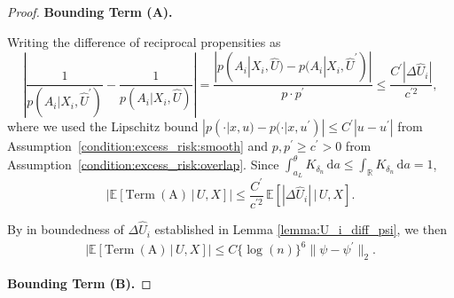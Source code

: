 \documentclass[12pt]{article}
\newcommand{\E}{\mathbb{E}}
\newcommand{\R}{\mathbb{R}}
\begin{document}
\begin{proof}
\noindent\textbf{Bounding Term (A).}

Writing the difference of reciprocal propensities as
$$\left|\frac{1}{p(A_i|X_i,\widehat U^\prime)}-\frac{1}{p(A_i|X_i,\widehat U)}\right| = \frac{|p(A_i|X_i,\widehat U)-p(A_i|X_i,\widehat U^\prime)|}{p\cdot p^\prime}\leq \frac{C^\prime|\Delta\widehat U_i|}{c^{\prime 2}},$$
where we used the Lipschitz bound $|p(\cdot|x,u)-p(\cdot|x,u^\prime)|\leq C^\prime|u-u^\prime|$ from Assumption~\ref{condition:excess_risk:smooth} and $p,p^\prime\geq c^\prime>0$ from Assumption~\ref{condition:excess_risk:overlap}.  Since $\int_{a_L}^{\theta}K_{\delta_n}\,\mathrm{d}a\leq \int_\R K_{\delta_n}\,\mathrm{d}a = 1$,
$$\left|\E\!\left[\mathrm{Term\ (A)}\,\big|\,U,X\right]\right| \leq \frac{C^\prime}{c^{\prime 2}}\,\E\!\left[|\Delta\widehat U_i|\,\big|\,U,X\right].$$

By in boundedness of $\Delta\widehat{U}_i$ established in Lemma \ref{lemma:U_i_diff_psi}, we then
\begin{align}
\left|\E\!\left[\mathrm{Term\ (A)}\,\big|\,U,X\right]\right|\leq C\{\log(n)\}^6\|\psi - \psi^\prime\|_2.
\label{eq:termA_psi}
\end{align}

\noindent\textbf{Bounding Term (B).}


\end{proof}
\end{document}
